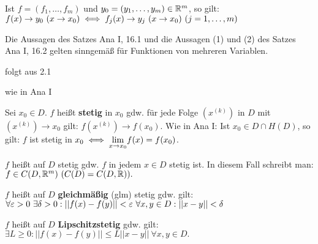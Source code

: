 \documentclass[a4paper,twoside,DIV15,BCOR12mm,chapterprefix=true,headings=twolinechapter]{scrbook}
\begin{document}
\begin{satz}
\begin{liste}
\item Ist $f = (f_1,\ldots,f_m)$ und $y_0 = (y_1,\ldots,y_m) \in \mathbb{R}^m$, so gilt: $f(x) \to y_0\ (x \to x_0) \iff f_j(x) \to y_j\ (x \to x_0)\ (j=1,\ldots,m)$
\item Die Aussagen des Satzes Ana I, 16.1 und die Aussagen (1) und (2) des Satzes Ana I, 16.2 gelten sinngemäß für Funktionen von mehreren Variablen.
\end{liste}
\end{satz}

\begin{beweise}
\item folgt aus 2.1
\item wie in Ana I
\end{beweise}

\begin{definition*}
\begin{liste}
\item {}Sei $x_0 \in D$. $f$ heißt \textbf{stetig} in $x_0$ gdw. für jede Folge $(x^{(k)})$ in $D$ mit $(x^{(k)}) \to x_0$ gilt: $f(x^{(k)}) \to f(x_0)$. Wie in Ana I: Ist $x_0 \in D \cap H(D)$, so gilt: $f$ ist stetig in $x_0 \iff \displaystyle{\lim_{x \to x_0}} f(x) = f(x_0)$.
\item {}$f$ heißt auf $D$ stetig gdw. $f$ in jedem $x \in D$ stetig ist. In diesem Fall schreibt man: $f \in C(D,\mathbb{R}^m)\ (C(D) = C(D,\mathbb{R})).$
\item {}$f$ heißt auf $D$ \textbf{gleichmäßig} (glm) stetig gdw. gilt:\\
$\forall \varepsilon>0\ \exists \delta>0: ||f(x)-f(y)|| < \varepsilon\ \forall x,y \in D: ||x-y|| < \delta$
\item {}$f$ heißt auf $D$  \textbf{Lipschitzstetig} gdw. gilt:\\
$\exists L\ge0: ||f(x)-f(y)|| \le L||x-y||\ \forall x,y \in D.$
\end{liste}
\end{definition*}
\end{document}
